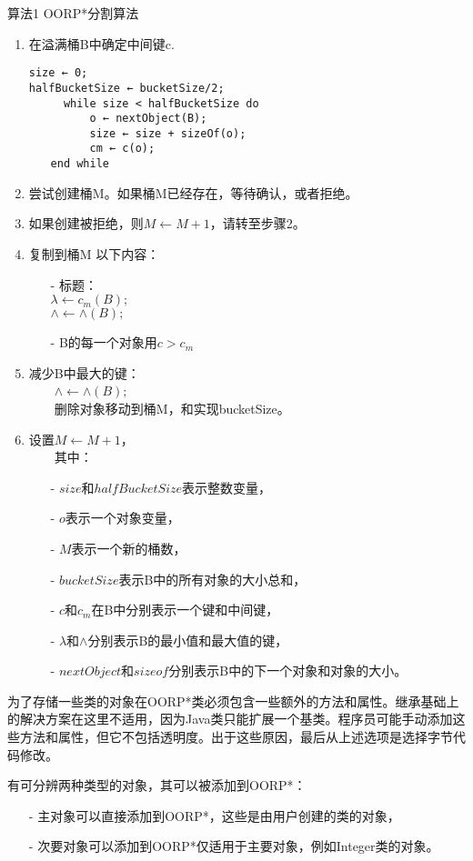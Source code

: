 \documentclass[10pt,a4paper]{article}
\begin{document}
\begin{CJK*}{UTF8}{gkai}
算法1 OORP*分割算法
\begin{enumerate}
\item 在溢满桶B中确定中间键c.
\begin{lstlisting}
size ← 0;
halfBucketSize ← bucketSize/2;
　　	while size < halfBucketSize do
　　		o ← nextObject(B);
　　		size ← size + sizeOf(o);
　　		cm ← c(o);
　　end while
\end{lstlisting}
\item 尝试创建桶M。如果桶M已经存在，等待确认，或者拒绝。
\item 如果创建被拒绝，则$M←M +1$，请转至步骤2。
\item 复制到桶M 以下内容：
\begin{itemize}
\item[-] 标题：\\
$\lambda \leftarrow c_m(B);$\\
$\wedge \leftarrow \wedge(B);$
\item[-] B的每一个对象用$c > c_m$
\end{itemize}
\item 减少B中最大的键：\\
　　$\wedge \leftarrow \wedge(B);$\\
　　删除对象移动到桶M，和实现bucketSize。
\item 设置$M←M +1$，\\
　　其中：
\begin{itemize}
\item[-] $size$和$halfBucketSize$表示整数变量，
\item[-] $o$表示一个对象变量，
\item[-] $M$表示一个新的桶数，
\item[-] $bucketSize$表示B中的所有对象的大小总和，
\item[-] $c$和$c_m$在B中分别表示一个键和中间键，
\item[-] $\lambda$和$\wedge$分别表示B的最小值和最大值的键，
\item[-] $nextObject$和$sizeof$分别表示B中的下一个对象和对象的大小。
\end{itemize}
\end{enumerate}


为了存储一些类的对象在OORP*类必须包含一些额外的方法和属性。继承基础上的解决方案在这里不适用，因为Java类只能扩展一个基类。程序员可能手动添加这些方法和属性，但它不包括透明度。出于这些原因，最后从上述选项是选择字节代码修改。


有可分辨两种类型的对象，其可以被添加到OORP*：
\begin{itemize}
\item[-] 主对象可以直接添加到OORP*，这些是由用户创建的类的对象，
\item[-] 次要对象可以添加到OORP*仅适用于主要对象，例如Integer类的对象。
\end{itemize}



\end{CJK*}
\end{document}
